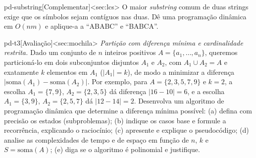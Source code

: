 \begin{exercicio}{pd-substring}[Complementar]<sec:lcs>
O maior \emph{substring} comum de duas strings exige que os símbolos sejam contíguos nas duas. Dê uma programação dinâmica em $O(nm)$ e aplique-a a ``ABABC'' e ``BABCA''.
\end{exercicio}
\begin{exercicio}{pd-t3}[Avaliação]<sec:mochila>
\emph{Partição com diferença mínima e cardinalidade restrita.} Dado um conjunto de $n$ inteiros positivos $A=\{a_1,\dots,a_n\}$, queremos particioná-lo em dois subconjuntos disjuntos $A_1$ e $A_2$, com $A_1\cup A_2=A$ e exatamente $k$ elementos em $A_1$ ($|A_1|=k$), de modo a minimizar a diferença $|\mathrm{soma}(A_1)-\mathrm{soma}(A_2)|$. Por exemplo, para $A=\{2,3,5,7,9\}$ e $k=2$, a escolha $A_1=\{7,9\}$, $A_2=\{2,3,5\}$ dá diferença $|16-10|=6$, e a escolha $A_1=\{3,9\}$, $A_2=\{2,5,7\}$ dá $|12-14|=2$. Desenvolva um algoritmo de programação dinâmica que determine a diferença mínima possível: (a) defina com precisão os estados (subproblemas); (b) indique os casos base e formule a recorrência, explicando o raciocínio; (c) apresente e explique o pseudocódigo; (d) analise as complexidades de tempo e de espaço em função de $n$, $k$ e $S=\mathrm{soma}(A)$; (e) diga se o algoritmo é polinomial e justifique.
\end{exercicio}
